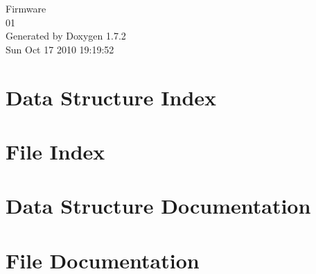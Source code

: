 \documentclass[a4paper]{book}
\begin{document}
\hypersetup{pageanchor=false}
\begin{titlepage}
\vspace*{7cm}
\begin{center}
{\Large Firmware \\[1ex]\large 01 }\\
\vspace*{1cm}
{\large Generated by Doxygen 1.7.2}\\
\vspace*{0.5cm}
{\small Sun Oct 17 2010 19:19:52}\\
\end{center}
\end{titlepage}
\clearemptydoublepage
{}
\tableofcontents
\clearemptydoublepage
{}
\hypersetup{pageanchor=true}
\chapter{Data Structure Index}

\chapter{File Index}

\chapter{Data Structure Documentation}












\chapter{File Documentation}






















\printindex
\end{document}
